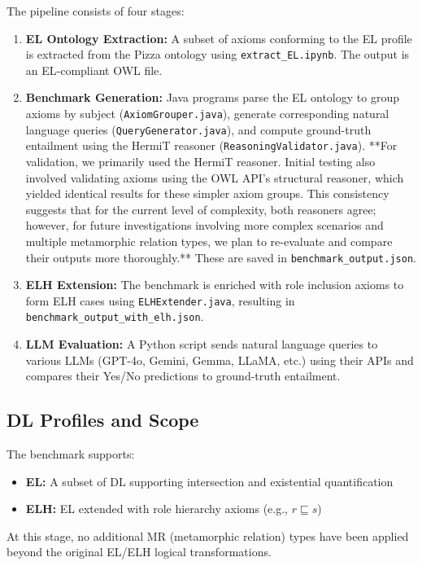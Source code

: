 \documentclass[11pt]{article}
\begin{document}
\newpage

The pipeline consists of four stages:

\begin{enumerate}
    \item \textbf{EL Ontology Extraction:} A subset of axioms conforming to the EL profile is extracted from the Pizza ontology using \texttt{extract\_EL.ipynb}. The output is an EL-compliant OWL file.
    
    \item \textbf{Benchmark Generation:} Java programs parse the EL ontology to group axioms by subject (\texttt{AxiomGrouper.java}), generate corresponding natural language queries (\texttt{QueryGenerator.java}), and compute ground-truth entailment using the HermiT reasoner (\texttt{ReasoningValidator.java}). **For validation, we primarily used the HermiT reasoner. Initial testing also involved validating axioms using the OWL API's structural reasoner, which yielded identical results for these simpler axiom groups. This consistency suggests that for the current level of complexity, both reasoners agree; however, for future investigations involving more complex scenarios and multiple metamorphic relation types, we plan to re-evaluate and compare their outputs more thoroughly.** These are saved in \texttt{benchmark\_output.json}.
    
    \item \textbf{ELH Extension:} The benchmark is enriched with role inclusion axioms to form ELH cases using \texttt{ELHExtender.java}, resulting in \texttt{benchmark\_output\_with\_elh.json}.
    
    \item \textbf{LLM Evaluation:} A Python script sends natural language queries to various LLMs (GPT-4o, Gemini, Gemma, LLaMA, etc.) using their APIs and compares their Yes/No predictions to ground-truth entailment.
\end{enumerate}

\subsection{DL Profiles and Scope}
The benchmark supports:
\begin{itemize}
    \item \textbf{EL:} A subset of DL supporting intersection and existential quantification
    \item \textbf{ELH:} EL extended with role hierarchy axioms (e.g., $r \sqsubseteq s$)
\end{itemize}
At this stage, no additional MR (metamorphic relation) types have been applied beyond the original EL/ELH logical transformations.
\end{document}
